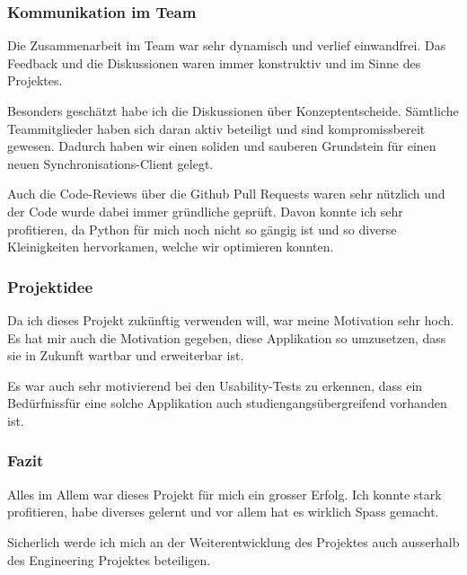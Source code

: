 \documentclass[a4paper]{article}
\begin{document}
  \subsubsection{Kommunikation im Team}

  Die Zusammenarbeit im Team war sehr dynamisch und verlief einwandfrei.
  Das Feedback und die Diskussionen waren immer konstruktiv und im Sinne des Projektes.

  Besonders geschätzt habe ich die Diskussionen über Konzeptentscheide.
  Sämtliche Teammitglieder haben sich daran aktiv beteiligt und sind kompromissbereit gewesen.
  Dadurch haben wir einen soliden und sauberen Grundstein für einen neuen Synchronisations-Client gelegt.

  Auch die Code-Reviews über die Github Pull Requests waren sehr nützlich und der Code wurde dabei immer gründliche geprüft.
  Davon konnte ich sehr profitieren, da Python für mich noch nicht so gängig ist und so diverse Kleinigkeiten hervorkamen, welche wir optimieren konnten.

  \subsubsection{Projektidee}

  Da ich dieses Projekt zukünftig verwenden will, war meine Motivation sehr hoch.
  Es hat mir auch die Motivation gegeben, diese Applikation so umzusetzen, dass sie in Zukunft wartbar und erweiterbar ist.

  Es war auch sehr motivierend bei den Usability-Tests zu erkennen, dass ein Bedürfnissfür eine solche Applikation auch studiengangsübergreifend vorhanden ist.

  \subsubsection{Fazit}

  Alles im Allem war dieses Projekt für mich ein grosser Erfolg.
  Ich konnte stark profitieren, habe diverses gelernt und vor allem hat es wirklich Spass gemacht.

  Sicherlich werde ich mich an der Weiterentwicklung des Projektes auch ausserhalb des Engineering Projektes beteiligen.
\end{document}
